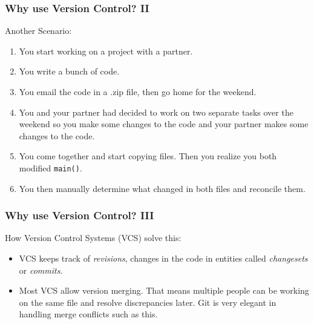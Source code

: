 \documentclass{lug}
\begin{document}
\begin{frame}
    \frametitle{Why use Version Control? II}

    Another Scenario:

    \begin{enumerate}[<+->]
        \item You start working on a project with a partner.
        \item You write a bunch of code.
        \item You email the code in a .zip file, then go home for the weekend.
        \item You and your partner had decided to work on two separate tasks over the weekend so you
            make some changes to the code and your partner makes some changes to the code.
        \item You come together and start copying files. Then you realize you both modified
            \texttt{main()}.
        \item You then manually determine what changed in both files and reconcile them.
    \end{enumerate}

\end{frame}

\begin{frame}
    \frametitle{Why use Version Control? III}

    How Version Control Systems (VCS) solve this:

    \begin{itemize}[<+->]
        \item VCS keeps track of \textit{revisions}, changes in the code in entities called
            \textit{changesets} or \textit{commits}.
        \item Most VCS allow version merging. That means multiple people can be working on the same
            file and resolve discrepancies later. Git is very elegant in handling merge conflicts
            such as this.
    \end{itemize}
\end{frame}
\end{document}

